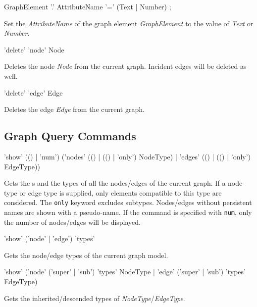 \begin{rail}
  GraphElement '.' AttributeName '=' (Text | Number) ;
\end{rail}
Set the  \emph{AttributeName} of the graph element \emph{GraphElement} to the value of \emph{Text} or \emph{Number}.

\begin{rail}
  'delete' 'node' Node
\end{rail}
Deletes the node \emph{Node} from the current graph. Incident edges will be deleted as well.

\begin{rail}
  'delete' 'edge' Edge
\end{rail}
Deletes the edge \emph{Edge} from the current graph.
  
\subsection{Graph Query Commands}

\begin{rail}
  'show' (() | 'num') ('nodes' (() | (() | 'only') NodeType) | 'edges' (() | (() | 'only') EdgeType))
\end{rail}
Gets the s and the types of all the nodes/edges of the current graph. 
If a node type or edge type is supplied, only elements compatible to this type are considered. 
The \texttt{only} keyword excludes subtypes. Nodes/edges without persistent names are shown with a pseudo-name.
If the command is specified with \texttt{num}, only the number of nodes/edges will be displayed.

\begin{rail}
  'show' ('node' | 'edge') 'types'
\end{rail}
Gets the node/edge types of the current graph model.

\begin{rail}
'show' ('node' ('super' | 'sub') 'types' NodeType | 'edge' ('super' | 'sub') 'types' EdgeType)
\end{rail}
Gets the inherited/descended types of \emph{NodeType}/\emph{EdgeType}.

